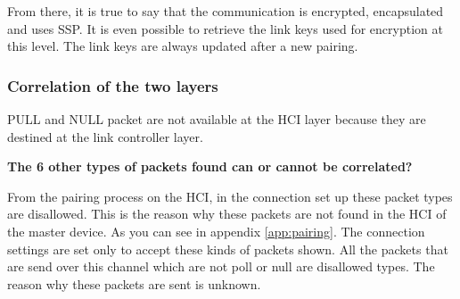 From there, it is true to say that the communication is encrypted, encapsulated and uses SSP. It is even possible to retrieve the link keys used for encryption at this level. The link keys are always updated after a new pairing.

\subsubsection{Correlation of the two layers}

PULL and NULL packet are not available at the HCI layer because they are destined at the link controller layer.

\textbf{The 6 other types of packets found can or cannot be correlated?}

From the pairing process on the HCI, in the connection set up these packet types are disallowed. This is the reason why these packets are not found in the HCI of the master device. As you can see in appendix \ref{app:pairing}. The connection settings are set only to accept these kinds of packets shown. All the packets that are send over this channel which are not poll or null are disallowed types. \pend
The reason why these packets are sent is unknown. 

